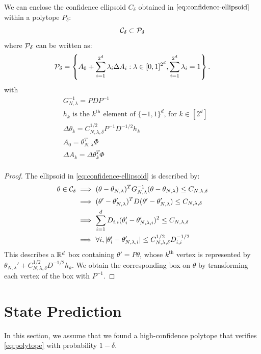 \documentclass{article}
\begin{document}
\begin{proposition}
We can enclose the confidence ellipsoid $C_\delta$ obtained in $\eqref{eq:confidence-ellipsoid}$ within a polytope $P_\delta$:
\[\mathcal{C}_\delta \subset \mathcal{P}_\delta\]
where $\mathcal{P}_\delta$ can be written as:
\begin{equation}
     \mathcal{P}_\delta = \left\{ A_{0}+\sum_{i=1}^{2^d}\lambda_{i}\Delta A_{i}: \lambda\in[0, 1]^{2^d},  \sum_{i=1}^{2^d}\lambda_{i}=1\right\}.
\end{equation}
with 
\begin{align*}
    &G_{N,\lambda}^{-1} = PDP^{-1}\\
    &h_k \text{ is the }k^\text{th}\text{ element of }\{-1,1\}^d\text{, for } k\in[2^d]\\
    &\Delta\theta_k = C_{N,\lambda,\delta}^{1/2} P^{-1}D^{-1/2} h_k \\
    &A_0 = \theta_{N,\lambda}^T\Phi\\
    &\Delta A_k = \Delta\theta_k^T\Phi\\
\end{align*}
\end{proposition}
\begin{proof}
The ellipsoid in \eqref{eq:confidence-ellipsoid} is described by:
\begin{align*}
    \theta\in\mathcal{C}_\delta &\implies
    (\theta-\theta_{N,\lambda})^T G_{N,\lambda}^{-1}(\theta-\theta_{N,\lambda}) \leq C_{N,\lambda,\delta}\\
    &\implies (\theta'-\theta'_{N,\lambda})^T D (\theta'-\theta'_{N,\lambda}) \leq C_{N,\lambda,\delta}\\
    &\implies \sum_{i=1}^d D_{i,i}(\theta'_i-\theta'_{N,\lambda,i})^2\leq C_{N,\lambda,\delta}\\
    &\implies\forall i, |\theta'_i-\theta'_{N,\lambda,i}|\leq C_{N,\lambda,\delta}^{1/2}D_{i,i}^{-1/2}
\end{align*}
This describes a $\mathbb{R}^d$ box containing $\theta' = P\theta$, whose $k^\text{th}$ vertex is represented by $\theta_{N,\lambda}' + C_{N,\lambda,\delta}^{1/2}D^{-1/2} h_k$. We obtain the corresponding box on $\theta$ by transforming each vertex of the box with $P^{-1}$.
\end{proof}




\section{State Prediction}

In this section, we assume that we found a high-confidence polytope that verifies \eqref{eq:polytope} with probability $1-\delta$.
\end{document}
